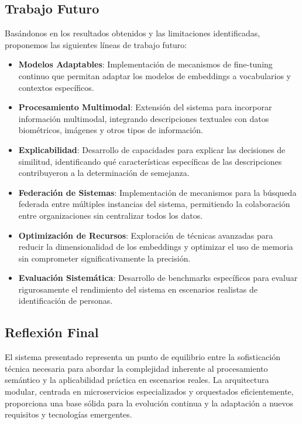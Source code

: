 \documentclass[12pt,a4paper]{article}
\begin{document}
\subsection{Trabajo Futuro}
\label{subsec:trabajo-futuro}

Basándonos en los resultados obtenidos y las limitaciones identificadas, proponemos las siguientes líneas de trabajo futuro:

\begin{itemize}
    \item \textbf{Modelos Adaptables}: Implementación de mecanismos de fine-tuning continuo que permitan adaptar los modelos de embeddings a vocabularios y contextos específicos.
    
    \item \textbf{Procesamiento Multimodal}: Extensión del sistema para incorporar información multimodal, integrando descripciones textuales con datos biométricos, imágenes y otros tipos de información.
    
    \item \textbf{Explicabilidad}: Desarrollo de capacidades para explicar las decisiones de similitud, identificando qué características específicas de las descripciones contribuyeron a la determinación de semejanza.
    
    \item \textbf{Federación de Sistemas}: Implementación de mecanismos para la búsqueda federada entre múltiples instancias del sistema, permitiendo la colaboración entre organizaciones sin centralizar todos los datos.
    
    \item \textbf{Optimización de Recursos}: Exploración de técnicas avanzadas para reducir la dimensionalidad de los embeddings y optimizar el uso de memoria sin comprometer significativamente la precisión.
    
    \item \textbf{Evaluación Sistemática}: Desarrollo de benchmarks específicos para evaluar rigurosamente el rendimiento del sistema en escenarios realistas de identificación de personas.
\end{itemize}

\subsection{Reflexión Final}
\label{subsec:reflexion}

El sistema presentado representa un punto de equilibrio entre la sofisticación técnica necesaria para abordar la complejidad inherente al procesamiento semántico y la aplicabilidad práctica en escenarios reales. La arquitectura modular, centrada en microservicios especializados y orquestados eficientemente, proporciona una base sólida para la evolución continua y la adaptación a nuevos requisitos y tecnologías emergentes.
\end{document}
